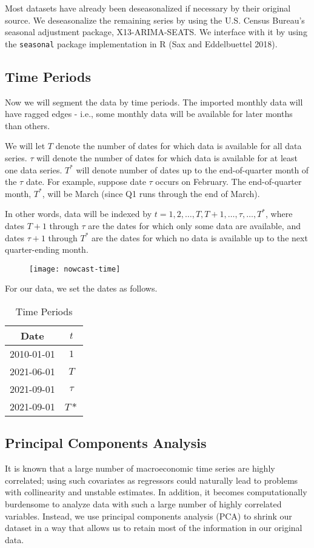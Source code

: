 \documentclass[11pt, letterpaper]{article}\usepackage[]{graphicx}\usepackage[]{color}
\begin{document}
Most datasets have already been deseasonalized if necessary by their original source. We deseasonalize the remaining series by using the U.S. Census Bureau's seasonal adjustment package, X13-ARIMA-SEATS. We interface with it by using the \texttt{seasonal} package implementation in R (Sax and Eddelbuettel 2018).

\subsection{Time Periods}
Now we will segment the data by time periods. The imported monthly data will have ragged edges - i.e., some monthly data will be available for later months than others.

We will let $T$ denote the number of dates for which data is available for all data series. $\tau$ will denote the number of dates for which data is available for at least one data series. $T^*$ will denote number of dates up to the end-of-quarter month of the $\tau$ date. For example, suppose date $\tau$ occurs on February. The end-of-quarter month, $T^*$, will be March (since Q1 runs through the end of March). 

In other words, data will be indexed by $t = 1, 2, \dots, T, T+1, \dots, \tau, \dots, T^*$, where dates $T + 1$ through $\tau$ are the dates for which only some data are available, and dates $\tau + 1$ through $T^*$ are the dates for which no data is available up to the next quarter-ending month.
\begin{figure}[H]
\texttt{[image: nowcast-time]}
\centering
\end{figure}
For our data, we set the dates as follows.
\begin{table}[H]
\centering
\begingroup\footnotesize
\begin{tabular}{cc}
  \hline
Date & $t$ \\ 
  \hline
2010-01-01 & $1$ \\ 
  2021-06-01 & $T$ \\ 
  2021-09-01 & $\tau$ \\ 
  2021-09-01 & $T*$ \\ 
   \hline
\end{tabular}
\endgroup
\caption{Time Periods} 
\end{table}


\subsection{Principal Components Analysis}
It is known that a large number of macroeconomic time series are highly correlated; using such covariates as regressors could naturally lead to problems with collinearity and unstable estimates. In addition, it becomes computationally burdensome to analyze data with such a large number of highly correlated variables. Instead, we use principal components analysis (PCA) to shrink our dataset in a way that allows us to retain most of the information in our original data.
\end{document}
